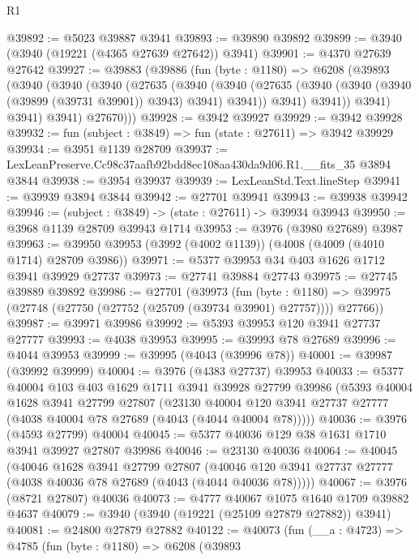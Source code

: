 \begin{lexlean}{R1}
\begin{coremodule}
@39892 := @5023 @39887 @3941
@39893 := @39890 @39892
@39899 := @3940 (@3940 (@19221 (@4365 @27639 @27642)) @3941)
@39901 := @4370 @27639 @27642
@39927 := @39883
    (@39886
      (fun (byte : @1180) =>
      @6208
        (@39893
          (@3940
            (@3940
              (@3940
                (@27635
                  (@3940
                    (@3940
                      (@27635 (@3940 (@3940 (@3940 (@39899 (@39731 @39901)) @3943) @3941) @3941))
                      @3941)
                    @3941))
                @3941)
              @3941)
            @3941)
          @27670)))
@39928 := @3942 @39927
@39929 := @3942 @39928
@39932 := fun (subject : @3849) => fun (state : @27611) => @3942 @39929
@39934 := @3951 @1139 @28709
@39937 := LexLeanPreserve.Cc98c37aafb92bdd8ec108aa430da9d06.R1.__fits_35 @3894 @3844
@39938 := @3954 @39937
@39939 := LexLeanStd.Text.lineStep
@39941 := @39939 @3894 @3844
@39942 := @27701 @39941
@39943 := @39938 @39942
@39946 := (subject : @3849) -> (state : @27611) -> @39934 @39943
@39950 := @3968 @1139 @28709 @39943 @1714
@39953 := @3976 (@3980 @27689) @3987
@39963 := @39950 @39953 (@3992 (@4002 @1139)) (@4008 (@4009 (@4010 @1714) @28709 @3986))
@39971 := @5377 @39953 @34 @403 @1626 @1712 @3941 @39929 @27737
@39973 := @27741 @39884 @27743
@39975 := @27745 @39889 @39892
@39986 := @27701
    (@39973
      (fun (byte : @1180) =>
      @39975 (@27748 (@27750 (@27752 (@25709 (@39734 @39901) @27757)))) @27766))
@39987 := @39971 @39986
@39992 := @5393 @39953 @120 @3941 @27737 @27777
@39993 := @4038 @39953
@39995 := @39993 @78 @27689
@39996 := @4044 @39953
@39999 := @39995 (@4043 (@39996 @78))
@40001 := @39987 (@39992 @39999)
@40004 := @3976 (@4383 @27737) @39953
@40033 := @5377
    @40004
    @103
    @403
    @1629
    @1711
    @3941
    @39928
    @27799
    @39986
    (@5393
      @40004
      @1628
      @3941
      @27799
      @27807
      (@23130 @40004 @120 @3941 @27737 @27777 (@4038 @40004 @78 @27689 (@4043 (@4044 @40004 @78)))))
@40036 := @3976 (@4593 @27799) @40004
@40045 := @5377 @40036 @129 @38 @1631 @1710 @3941 @39927 @27807 @39986
@40046 := @23130 @40036
@40064 := @40045
    (@40046
      @1628
      @3941
      @27799
      @27807
      (@40046 @120 @3941 @27737 @27777 (@4038 @40036 @78 @27689 (@4043 (@4044 @40036 @78)))))
@40067 := @3976 (@8721 @27807) @40036
@40073 := @4777 @40067 @1075 @1640 @1709 @39882 @4637
@40079 := @3940 (@3940 (@19221 (@25109 @27879 @27882)) @3941)
@40081 := @24800 @27879 @27882
@40122 := @40073
    (fun (__a : @4723) =>
    @4785
      (fun (byte : @1180) =>
      @6208
        (@39893

\end{coremodule}
\end{lexlean}
